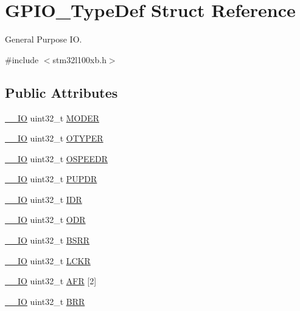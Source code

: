 \hypertarget{struct_g_p_i_o___type_def}{\section{G\-P\-I\-O\-\_\-\-Type\-Def Struct Reference}
\label{struct_g_p_i_o___type_def}
}


General Purpose I\-O.  




{\ttfamily \#include $<$stm32l100xb.\-h$>$}

\subsection*{Public Attributes}
\begin{DoxyCompactItemize}
\item 
\hyperlink{core__sc300_8h_aec43007d9998a0a0e01faede4133d6be}{\-\_\-\-\_\-\-I\-O} uint32\-\_\-t \hyperlink{struct_g_p_i_o___type_def_ac2505d096b6b650f1647b8e0ff8b196b}{M\-O\-D\-E\-R}
\item 
\hyperlink{core__sc300_8h_aec43007d9998a0a0e01faede4133d6be}{\-\_\-\-\_\-\-I\-O} uint32\-\_\-t \hyperlink{struct_g_p_i_o___type_def_a910885e4d881c3a459dd11640237107f}{O\-T\-Y\-P\-E\-R}
\item 
\hyperlink{core__sc300_8h_aec43007d9998a0a0e01faede4133d6be}{\-\_\-\-\_\-\-I\-O} uint32\-\_\-t \hyperlink{struct_g_p_i_o___type_def_a0d233d720f18ae2050f9131fa6faf7c6}{O\-S\-P\-E\-E\-D\-R}
\item 
\hyperlink{core__sc300_8h_aec43007d9998a0a0e01faede4133d6be}{\-\_\-\-\_\-\-I\-O} uint32\-\_\-t \hyperlink{struct_g_p_i_o___type_def_a44ada3bfbe891e2efc1e06bda4c8014e}{P\-U\-P\-D\-R}
\item 
\hyperlink{core__sc300_8h_aec43007d9998a0a0e01faede4133d6be}{\-\_\-\-\_\-\-I\-O} uint32\-\_\-t \hyperlink{struct_g_p_i_o___type_def_acf11156409414ad8841bb0b62959ee96}{I\-D\-R}
\item 
\hyperlink{core__sc300_8h_aec43007d9998a0a0e01faede4133d6be}{\-\_\-\-\_\-\-I\-O} uint32\-\_\-t \hyperlink{struct_g_p_i_o___type_def_a6fb78f4a978a36032cdeac93ac3c9c8b}{O\-D\-R}
\item 
\hyperlink{core__sc300_8h_aec43007d9998a0a0e01faede4133d6be}{\-\_\-\-\_\-\-I\-O} uint32\-\_\-t \hyperlink{struct_g_p_i_o___type_def_acd6f21e08912b484c030ca8b18e11cd6}{B\-S\-R\-R}
\item 
\hyperlink{core__sc300_8h_aec43007d9998a0a0e01faede4133d6be}{\-\_\-\-\_\-\-I\-O} uint32\-\_\-t \hyperlink{struct_g_p_i_o___type_def_a95a59d4b1d52be521f3246028be32f3e}{L\-C\-K\-R}
\item 
\hyperlink{core__sc300_8h_aec43007d9998a0a0e01faede4133d6be}{\-\_\-\-\_\-\-I\-O} uint32\-\_\-t \hyperlink{struct_g_p_i_o___type_def_af5b9bb2c6faec85580a3113de9af2fd0}{A\-F\-R} \mbox{[}2\mbox{]}
\item 
\hyperlink{core__sc300_8h_aec43007d9998a0a0e01faede4133d6be}{\-\_\-\-\_\-\-I\-O} uint32\-\_\-t \hyperlink{struct_g_p_i_o___type_def_aab918bfbfae459789db1fd0b220c7f21}{B\-R\-R}
\end{DoxyCompactItemize}


